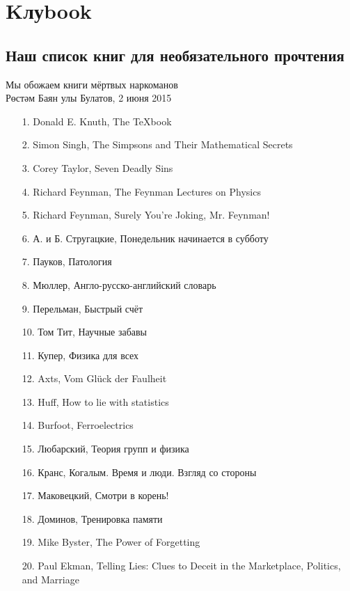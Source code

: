 \section*{Kлуbook} 
\subsection*{Наш список книг для необязательного прочтения} %
\begin{epigraph}
    Мы обожаем книги мёртвых наркоманов\\
    {\normalfont Рөстәм Баян улы Булатов, 2 июня 2015}
\end{epigraph}

\begin{itemize}
        \item[1.] Donald E. Knuth, The {\TeX}book
        \item[2.] Simon Singh, The Simpsons and Their Mathematical Secrets
        \item[3.] Corey Taylor, Seven Deadly Sins 
        \item[4.] Richard Feynman, The Feynman Lectures on Physics
        \item[5.] Richard Feynman, Surely You're Joking, Mr. Feynman!
        \item[6.] А. и Б. Стругацкие, Понедельник начинается в субботу
        \item[7.] Пауков, Патология
        \item[8.] Мюллер, Англо-русско-английский словарь
        \item[9.] Перельман, Быстрый счёт
        \item[10.] Том Тит, Научные забавы
        \item[11.] Купер, Физика для всех
        \item[12.] Axts,  Vom Gl\"uck der Faulheit 
        \item[13.] Huff, How to lie with statistics
        \item[14.] Burfoot, Ferroelectrics
        \item[15.] Любарский, Теория групп и физика
        \item[16.] Кранс, Когалым. Время и люди. Взгляд со стороны
        \item[17.] Маковецкий, Смотри в корень!
        \item[18.] Доминов, Тренировка памяти
        \item[19.] Mike Byster, The Power of Forgetting
        \item[20.] Paul Ekman, Telling Lies: Clues to Deceit in the Marketplace, Politics, and Marriage

\end{itemize}
